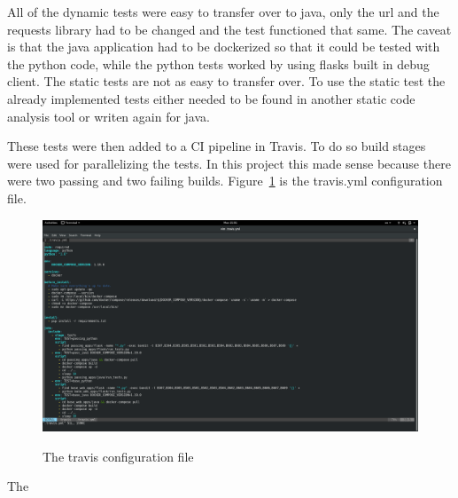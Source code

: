 All of the dynamic tests were easy to transfer over to java, only the url and the requests library had to be changed and the test functioned that same. The caveat is that the java application had to
be dockerized so that it could be tested with the python code, while the python tests worked by using flasks built in debug client. The static tests are not as easy to transfer over. To use the
static test the already implemented tests either needed to be found in another static code analysis tool or writen again for java.

These tests were then added to a CI pipeline in Travis. To do so build stages were used for parallelizing the tests. In this project this made sense because there were two passing and two failing
builds. Figure~\ref{fig:fig2} is the travis.yml configuration file.
\begin{figure}[!ht]
  \centering
\includegraphics[width=6in]{travis}
\caption{\label{fig:fig2}}The travis configuration file
\end{figure}
The 
